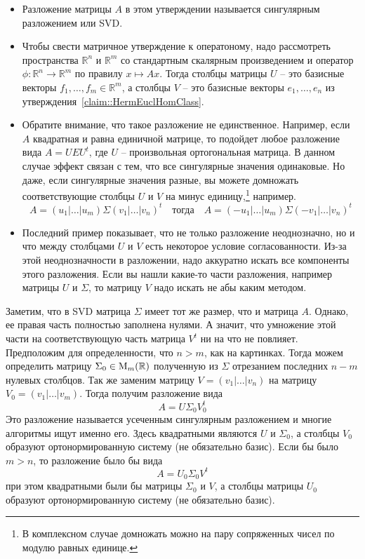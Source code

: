 \begin{itemize}
\item Разложение матрицы $A$ в этом утверждении называется сингулярным разложением или SVD.

\item
Чтобы свести матричное утверждение к оператоному, надо рассмотреть пространства $\mathbb R^n$ и $\mathbb R^m$ со стандартным скалярным произведением и оператор $\phi\colon \mathbb R^n \to \mathbb R^m$ по правилу $x\mapsto Ax$. Тогда столбцы матрицы $U$ -- это базисные векторы $f_1,\ldots,f_m\in \mathbb R^m$, а столбцы $V$ -- это базисные векторы $e_1,\ldots,e_n$ из утверждения~\ref{claim::HermEuclHomClass}.

\item
Обратите внимание, что такое разложение не единственное. Например, если $A$ квадратная и равна единичной матрице, то подойдет любое разложение вида $A = U E U^t$, где $U$ -- произвольная ортогональная матрица. В данном случае эффект связан с тем, что все сингулярные значения одинаковые. Но даже, если сингулярные значения разные, вы можете домножать соответствующие столбцы $U$ и $V$ на минус единицу,\footnote{В комплексном случае домножать можно на пару сопряженных чисел по модулю равных единице.} например.
\[
A = (u_1|\ldots | u_m)\Sigma (v_1|\ldots|v_n)^t
\quad\text{тогда}\quad
A = (-u_1|\ldots | u_m)\Sigma (-v_1|\ldots|v_n)^t
\]
\item
Последний пример показывает, что не только разложение неоднозначно, но и что между столбцами $U$ и $V$ есть некоторое условие согласованности. Из-за этой неоднозначности в разложении, надо аккуратно искать все компоненты этого разложения. Если вы нашли какие-то части разложения, например матрицы $U$ и $\Sigma$, то матрицу $V$ надо искать не абы каким методом.
\end{itemize}

Заметим, что в SVD матрица $\Sigma$ имеет тот же размер, что и матрица $A$. Однако, ее правая часть полностью заполнена нулями. А значит, что умножение этой части на соответствующую часть матрица $V^t$ ни на что не повлияет. Предположим для определенности, что $n > m$, как на картинках. Тогда можем определить матрицу $\Sigma_0\in \operatorname{M}_{m}(\mathbb R)$ полученную из $\Sigma$ отрезанием последних $n - m$ нулевых столбцов. Так же заменим матрицу $V = (v_1|\ldots|v_n)$ на матрицу $V_0 = (v_1|\ldots|v_m)$. Тогда получим разложение вида 
\[
A = U \Sigma_0 V_0^t
\]
Это разложение называется усеченным сингулярным разложением и многие алгоритмы ищут именно его. Здесь квадратными являются $U$ и $\Sigma_0$, а столбцы $V_0$ образуют ортонормированную систему (не обязательно базис). Если бы было $m > n$, то разложение было бы вида
\[
A = U_0 \Sigma_0 V^t
\]
при этом квадратными были бы матрицы $\Sigma_0$ и $V$, а столбцы матрицы $U_0$ образуют ортонормированную систему (не обязательно базис).


